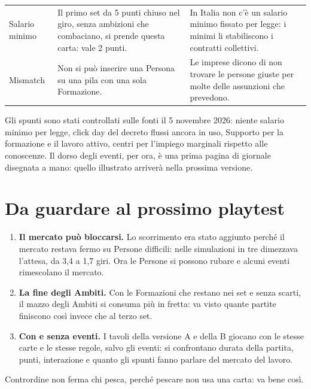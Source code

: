 \documentclass[11pt,a4paper]{article}
\begin{document}
{\begin{xltabular}{\textwidth}{@{}P{2.9cm}LL@{}}
Salario minimo & Il primo set da 5 punti chiuso nel giro, senza ambizioni che combaciano, si prende questa carta: vale 2 punti. & In Italia non c'è un salario minimo fissato per legge: i minimi li stabiliscono i contratti collettivi. \\
Mismatch & Non si può inserire una Persona su una pila con una sola Formazione. & Le imprese dicono di non trovare le persone giuste per molte delle assunzioni che prevedono. \\
\bottomrule
\end{xltabular}
}

Gli spunti sono stati controllati sulle fonti il 5 novembre 2026: niente salario minimo per legge, click day del
decreto flussi ancora in uso, Supporto per la formazione e il lavoro attivo, centri per l'impiego marginali rispetto
alle conoscenze. Il dorso degli eventi, per ora, è una prima pagina di giornale disegnata a mano: quello illustrato
arriverà nella prossima versione.

\section{Da guardare al prossimo playtest}

\begin{enumerate}[leftmargin=*,itemsep=0.4em]
\item \textbf{Il mercato può bloccarsi.} Lo scorrimento era stato aggiunto perché il mercato restava fermo su
Persone difficili: nelle simulazioni in tre dimezzava l'attesa, da 3,4 a 1,7 giri. Ora le Persone si possono
rubare e alcuni eventi rimescolano il mercato.
\item \textbf{La fine degli Ambiti.} Con le Formazioni che restano nei set e senza scarti, il mazzo degli Ambiti
si consuma più in fretta: va visto quante partite finiscono così invece che al terzo set.
\item \textbf{Con e senza eventi.} I tavoli della versione A e della B giocano con le stesse carte e le stesse
regole, salvo gli eventi: si confrontano durata della partita, punti, interazione e quanto gli spunti fanno
parlare del mercato del lavoro.
\end{enumerate}

Contrordine non ferma chi pesca, perché pescare non usa una carta: va bene così.
\end{document}
